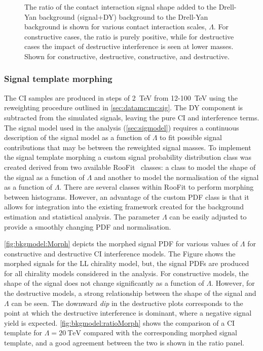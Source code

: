 \begin{figure}[]
\begin{subfigure}[b]{0.49\textwidth}
        \caption{}
        \label{fig:datamc:sigShape4}
    \end{subfigure}
    \caption[The ratio of the contact interaction signal shape added to the Drell-Yan background (signal+DY) background to the Drell-Yan background is shown for various contact interaction scales, $\Lambda$.]{The ratio of the contact interaction signal shape added to the Drell-Yan background (signal+DY) background to the Drell-Yan background is shown for various contact interaction scales, $\Lambda$. For constructive cases, the ratio is purely positive, while for destructive cases the impact of destructive interference is seen at lower masses. Shown for \ee constructive, \ee destructive, \mumu constructive, and \mumu destructive.}
    \label{fig:datamc:sigShape}
\end{figure}

\subsubsection{Signal template morphing}\label{sec:datamc:mc:sig:morphing}
The CI samples are produced in steps of \SI{2}{\tera\electronvolt} from 12-\SI{100} {\tera\electronvolt} using the reweighting procedure outlined in \cref{sec:datamc:mc:sig}. The DY component is subtracted from the simulated signals, leaving the pure CI and interference terms. The signal model used in the analysis (\cref{sec:sigmodel}) requires a continuous description of the signal model as a function of $\Lambda$ to fit possible signal contributions that may be between the reweighted signal masses. To implement the signal template morphing a custom signal probability distribution class was created derived from two available RooFit~\cite{RooFit} classes: a class to model the shape of the signal as a function of $\Lambda$ and another to model the normalisation of the signal as a function of $\Lambda$. There are several classes within RooFit to perform morphing between histograms. However, an advantage of the custom PDF class is that it allows for integration into the existing framework created for the background estimation and statistical analysis. The parameter $\Lambda$ can be easily adjusted to provide a smoothly changing PDF and normalisation.

\cref{fig:bkgmodel:Morph} depicts the morphed signal PDF for various values of $\Lambda$ for constructive and destructive CI interference models. The Figure shows the morphed signals for the LL chirality model, but, the signal PDFs are produced for all chirality models considered in the analysis. For constructive models, the shape of the signal does not change significantly as a function of $\Lambda$. However, for the destructive models, a strong relationship between the shape of the signal and $\Lambda$ can be seen. The downward \emph{dip} in the destructive plots corresponds to the point at which the destructive interference is dominant, where a negative signal yield is expected. \cref{fig:bkgmodel:ratioMorph} shows the comparison of a CI template for $\Lambda = \SI{20}{\tera\electronvolt}$ compared with the corresponding morphed signal template, and a good agreement between the two is shown in the ratio panel. 

